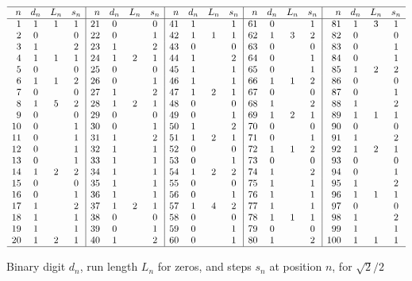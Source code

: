 \documentclass[oneside,10pt]{book}
\renewcommand{\arraystretch}{1.4} %
\begin{document}

\begin{table}[H]
\small
\setlength\extrarowheight{-2pt}
\[
\begin{array}{rccc|rccc|rccc|rccc|rccc}
\hline
n	&  d_n & L_n & s_n & n	&  d_n & L_n & s_n & n	&  d_n & L_n & s_n & n	&  d_n & L_n & s_n & n	&  d_n & L_n & s_n\\ 
\hline
1	&	1	&	1	&	1	&	21	&	0	&		&	0	&	41	&	1	&		&	1	&	61	&	0	&		&	1	&	81	&	1	&	3	&	1	\\
2	&	0	&		&	0	&	22	&	0	&		&	1	&	42	&	1	&	1	&	1	&	62	&	1	&	3	&	2	&	82	&	0	&		&	0	\\
3	&	1	&		&	2	&	23	&	1	&		&	2	&	43	&	0	&		&	0	&	63	&	0	&		&	0	&	83	&	0	&		&	1	\\
4	&	1	&	1	&	1	&	24	&	1	&	2	&	1	&	44	&	1	&		&	2	&	64	&	0	&		&	1	&	84	&	0	&		&	1	\\
5	&	0	&		&	0	&	25	&	0	&		&	0	&	45	&	1	&		&	1	&	65	&	0	&		&	1	&	85	&	1	&	2	&	2	\\
6	&	1	&	1	&	2	&	26	&	0	&		&	1	&	46	&	1	&		&	1	&	66	&	1	&	1	&	2	&	86	&	0	&		&	0	\\
7	&	0	&		&	0	&	27	&	1	&		&	2	&	47	&	1	&	2	&	1	&	67	&	0	&		&	0	&	87	&	0	&		&	1	\\
8	&	1	&	5	&	2	&	28	&	1	&	2	&	1	&	48	&	0	&		&	0	&	68	&	1	&		&	2	&	88	&	1	&		&	2	\\
9	&	0	&		&	0	&	29	&	0	&		&	0	&	49	&	0	&		&	1	&	69	&	1	&	2	&	1	&	89	&	1	&	1	&	1	\\
10	&	0	&		&	1	&	30	&	0	&		&	1	&	50	&	1	&		&	2	&	70	&	0	&		&	0	&	90	&	0	&		&	0	\\
11	&	0	&		&	1	&	31	&	1	&		&	2	&	51	&	1	&	2	&	1	&	71	&	0	&		&	1	&	91	&	1	&		&	2	\\
12	&	0	&		&	1	&	32	&	1	&		&	1	&	52	&	0	&		&	0	&	72	&	1	&	1	&	2	&	92	&	1	&	2	&	1	\\
13	&	0	&		&	1	&	33	&	1	&		&	1	&	53	&	0	&		&	1	&	73	&	0	&		&	0	&	93	&	0	&		&	0	\\
14	&	1	&	2	&	2	&	34	&	1	&		&	1	&	54	&	1	&	2	&	2	&	74	&	1	&		&	2	&	94	&	0	&		&	1	\\
15	&	0	&		&	0	&	35	&	1	&		&	1	&	55	&	0	&		&	0	&	75	&	1	&		&	1	&	95	&	1	&		&	2	\\
16	&	0	&		&	1	&	36	&	1	&		&	1	&	56	&	0	&		&	1	&	76	&	1	&		&	1	&	96	&	1	&	1	&	1	\\
17	&	1	&		&	2	&	37	&	1	&	2	&	1	&	57	&	1	&	4	&	2	&	77	&	1	&		&	1	&	97	&	0	&		&	0	\\
18	&	1	&		&	1	&	38	&	0	&		&	0	&	58	&	0	&		&	0	&	78	&	1	&	1	&	1	&	98	&	1	&		&	2	\\
19	&	1	&		&	1	&	39	&	0	&		&	1	&	59	&	0	&		&	1	&	79	&	0	&		&	0	&	99	&	1	&		&	1	\\
20	&	1	&	2	&	1	&	40	&	1	&		&	2	&	60	&	0	&		&	1	&	80	&	1	&		&	2	&	100	&	1	&	1	&	1	\\
\hline
\end{array}
\]
\caption{\label{tafghur} Binary digit $d_n$, run length $L_n$ for zeros, and steps $s_n$ at position $n$, for $\sqrt{2}/2$}
\end{table}
\end{document}
